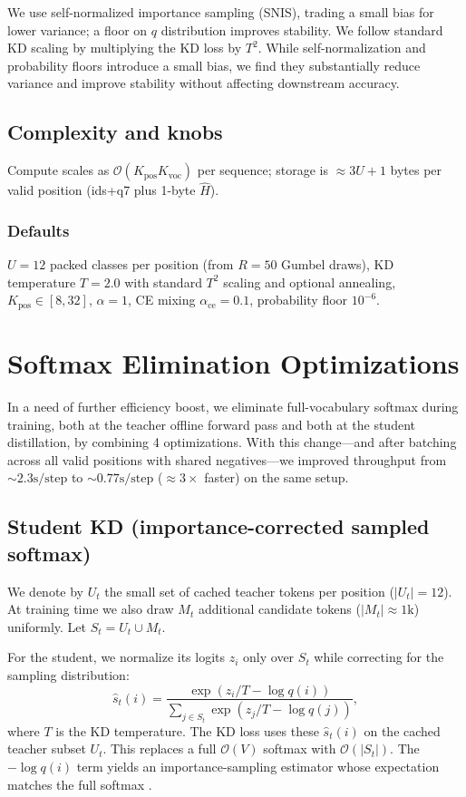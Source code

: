 \documentclass[11pt]{article}
\begin{document}
We use self-normalized importance sampling (SNIS), trading a small bias for lower variance; a floor on $q$ distribution improves stability.
We follow standard KD scaling by multiplying the KD loss by $T^2$. While self-normalization and probability floors introduce a small bias, we find they substantially reduce variance and improve stability without affecting downstream accuracy.

\subsection{Complexity and knobs}
Compute scales as $\mathcal{O}(K_{\text{pos}}K_{\text{voc}})$ per sequence; storage is $\approx 3U + 1$ bytes per valid position (ids+q7 plus 1-byte $\hat H$).

\subsubsection{Defaults} $U{=}12$ packed classes per position (from $R{=}50$ Gumbel draws), KD temperature $T{=}2.0$ with standard $T^2$ scaling and optional annealing, $K_{\text{pos}}\!\in\![8,32]$, $\alpha{=}1$, CE mixing $\alpha_{\text{ce}}{=}0.1$, probability floor $10^{-6}$.

\section{Softmax Elimination Optimizations}
\label{sec:softmax_elimination}
In a need of further efficiency boost, we eliminate full-vocabulary softmax during training, both at the teacher offline forward pass and both at the student distillation, by combining 4 optimizations.
With this change---and after batching across all valid positions with shared negatives---we improved throughput from $\sim\!2.3\text{s}/\text{step}$ to $\sim\!0.77\text{s}/\text{step}$ ($\approx3\times$ faster) on the same setup.

\subsection{Student KD (importance-corrected sampled softmax)}
\label{sec:sampled_softmax}
We denote by $U_t$ the small set of cached teacher tokens per position ($|U_t|=12$).
At training time we also draw $M_t$ additional candidate tokens ($|M_t| \approx 1\text{k}$) uniformly.
Let $S_t = U_t \cup M_t$.

For the student, we normalize its logits $z_i$ only over $S_t$ while correcting for the sampling distribution:
\[
	\hat s_t(i) = \frac{\exp(z_i/T - \log q(i))}{\sum_{j \in S_t} \exp(z_j/T - \log q(j))},
\]
where $T$ is the KD temperature.
The KD loss uses these $\hat s_t(i)$ on the cached teacher subset $U_t$. This replaces a full $\mathcal{O}(V)$ softmax with $\mathcal{O}(|S_t|)$.
The $-\log q(i)$ term yields an importance-sampling estimator whose expectation matches the full softmax \citep{jean2015large}.
\end{document}
